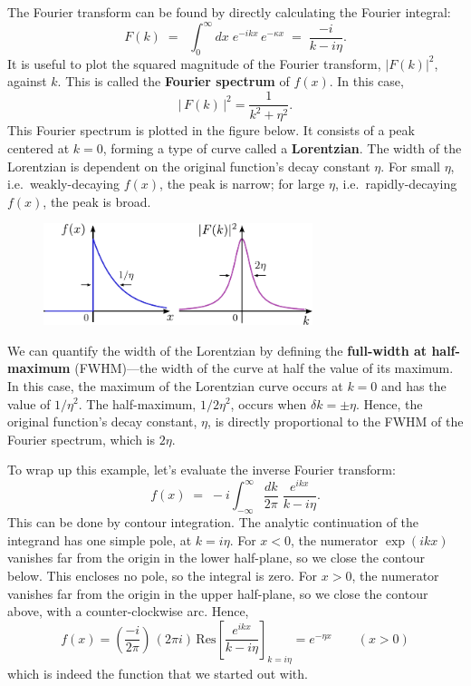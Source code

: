 \documentclass[10pt,a4paper]{article}
\begin{document}
The Fourier transform can be found by directly calculating the Fourier
integral:
\begin{equation}
F(k) \;=\; \;\int_{0}^\infty dx\; e^{-i kx}\, e^{-\kappa x} \;=\; \frac{-i}{k - i \eta}.
\end{equation}
It is useful to plot the squared magnitude of the Fourier transform,
$|F(k)|^2$, against $k$. This is called the \textbf{Fourier
spectrum} of $f(x)$. In this case,
\begin{equation}
\big|\,F(k)\,\big|^2 = \frac{1}{k^2 + \eta^2}.
\end{equation}
This Fourier spectrum is plotted in the figure below. It consists of a
peak centered at $k = 0$, forming a type of curve called a
\textbf{Lorentzian}. The width of the Lorentzian is dependent on the
original function's decay constant $\eta$. For small $\eta$,
i.e.~weakly-decaying $f(x)$, the peak is narrow; for large $\eta$,
i.e.~rapidly-decaying $f(x)$, the peak is broad.

\begin{figure}[h]
  \centering\includegraphics[width=0.7\textwidth]{fourier_example1}
\end{figure}

We can quantify the width of the Lorentzian by defining the
\textbf{full-width at half-maximum} (FWHM)---the width of the curve at
half the value of its maximum. In this case, the maximum of the
Lorentzian curve occurs at $k=0$ and has the value of $1/\eta^2$.  The
half-maximum, $1/2\eta^2$, occurs when $\delta k = \pm \eta$.  Hence,
the original function's decay constant, $\eta$, is directly
proportional to the FWHM of the Fourier spectrum, which is $2\eta$.

To wrap up this example, let's evaluate the inverse Fourier transform:
\begin{equation}
f(x) \; = \; -i\int_{-\infty}^\infty \frac{dk}{2\pi} \; \frac{e^{i kx}}{k-i\eta}.
\end{equation}
This can be done by contour integration. The analytic continuation of
the integrand has one simple pole, at $k = i\eta$. For $x < 0$, the
numerator $\exp(ikx)$ vanishes far from the origin in the lower
half-plane, so we close the contour below. This encloses no pole, so
the integral is zero. For $x > 0$, the numerator vanishes far from the
origin in the upper half-plane, so we close the contour above, with a
counter-clockwise arc.  Hence,
\begin{equation}
f(x) = \left(\frac{-i}{2\pi}\right) \, \left(2\pi i\right) \, \mathrm{Res}\left[ \frac{e^{ikx}}{k-i\eta}\right]_{k=i\eta} = e^{-\eta x} \qquad(x > 0)
\end{equation}
which is indeed the function that we started out with.
\end{document}
